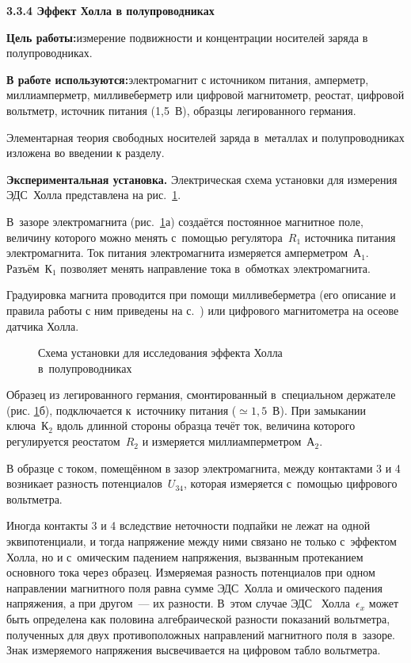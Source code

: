 {\large \bf 3.3.4 Эффект Холла в полупроводниках}

{\bf Цель работы:}{измерение подвижности и концентрации носителей заряда в полупроводниках.}

{\bf В работе используются:}{электромагнит с источником питания, амперметр, миллиамперметр, милливеберметр или цифровой магнитометр, реостат, цифровой вольтметр,
источник питания (1,5~В), образцы легированного германия.}

Элементарная теория свободных носителей заряда в~металлах и полупроводниках изложена во введении к разделу.

{\bf Экспериментальная установка.} Электрическая схема установки для измерения ЭДС~Холла представлена на рис.~\ref{fig3.4.1}.

В~зазоре электромагнита (рис.~\ref{fig3.4.1}а) создаётся постоянное магнитное поле, величину которого можно менять с~помощью регулятора~$R_1$ источника питания электромагнита. Ток питания электромагнита измеряется амперметром~А$_1$. Разъём~К$_1$ позволяет менять направление тока в~обмотках электромагнита.

Градуировка магнита проводится при помощи милливеберметра (его описание и правила работы с ним приведены на с.~\pageref{MWB}) или цифрового магнитометра на осеове датчика Холла.

\begin{figure}
\caption{Схема установки для исследования эффекта Холла в~полупроводниках}
\label{fig3.4.1}
\end{figure}

Образец из легированного германия, смонтированный в~специальном держателе (рис. \ref{fig3.4.1}б), подключается к~источнику питания ($\simeq 1,5$~В). При замыкании ключа~К$_2$ вдоль длинной стороны образца течёт ток, величина которого регулируется реостатом~$R_2$ и измеряется миллиамперметром~А$_2$.

В образце с током, помещённом в зазор электромагнита, между контактами 3 и 4 возникает разность потенциалов~$U_{34}$, которая измеряется с~помощью цифрового вольтметра.

Иногда контакты 3 и 4 вследствие неточности подпайки не лежат на одной эквипотенциали, и тогда напряжение между ними связано не только с~эффектом Холла, но и с~омическим падением напряжения, вызванным протеканием основного тока  через образец. Измеряемая разность потенциалов при одном направлении магнитного поля равна сумме ЭДС~Холла и омического падения напряжения, а при другом~--- их разности. В~этом случае ЭДС ~Холла~$\epsilon_x$ может быть определена как половина алгебраической разности показаний вольтметра, полученных для двух противоположных направлений магнитного поля в~зазоре. Знак измеряемого напряжения высвечивается на цифровом табло вольтметра.

